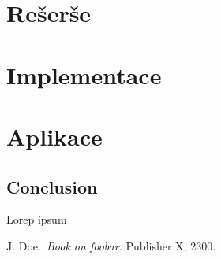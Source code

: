 \documentclass{ctuthesis}
\begin{document}
\maketitle



\part{Rešerše}



\part{Implementace}



\part{Aplikace}

\chapter{Conclusion}

Lorep ipsum~\cite{doe}

\begin{thebibliography}{1}

     J. Doe.\ \emph{Book on foobar.} Publisher X, 2300.

\end{thebibliography}
\end{document}
